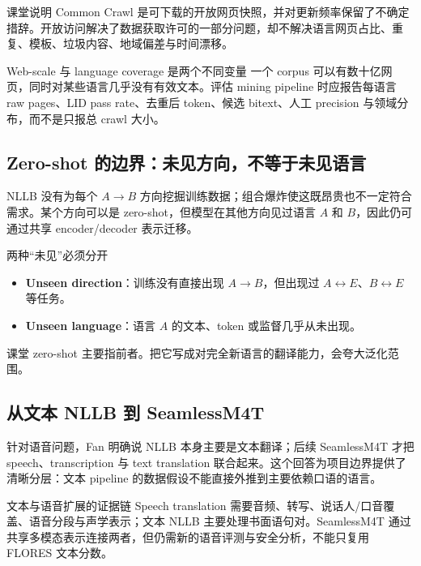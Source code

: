 \documentclass[a4paper]{article}
\begin{document}
课堂说明 Common Crawl 是可下载的开放网页快照，并对更新频率保留了不确定措辞。开放访问解决了数据获取许可的一部分问题，却不解决语言网页占比、重复、模板、垃圾内容、地域偏差与时间漂移。

\begin{warningbox}{Web-scale 与 language coverage 是两个不同变量}
一个 corpus 可以有数十亿网页，同时对某些语言几乎没有有效文本。评估 mining pipeline 时应报告每语言 raw pages、LID pass rate、去重后 token、候选 bitext、人工 precision 与领域分布，而不是只报总 crawl 大小。
\end{warningbox}

\subsection{Zero-shot 的边界：未见方向，不等于未见语言}

NLLB 没有为每个 $A\rightarrow B$ 方向挖掘训练数据；组合爆炸使这既昂贵也不一定符合需求。某个方向可以是 zero-shot，但模型在其他方向见过语言 $A$ 和 $B$，因此仍可通过共享 encoder/decoder 表示迁移。

\begin{importantbox}{两种“未见”必须分开}
\begin{itemize}
  \item \textbf{Unseen direction}：训练没有直接出现 $A\rightarrow B$，但出现过 $A\leftrightarrow E$、$B\leftrightarrow E$ 等任务。
  \item \textbf{Unseen language}：语言 $A$ 的文本、token 或监督几乎从未出现。
\end{itemize}
课堂 zero-shot 主要指前者。把它写成对完全新语言的翻译能力，会夸大泛化范围。
\end{importantbox}


\subsection{从文本 NLLB 到 SeamlessM4T}

针对语音问题，Fan 明确说 NLLB 本身主要是文本翻译；后续 SeamlessM4T 才把 speech、transcription 与 text translation 联合起来。这个回答为项目边界提供了清晰分层：文本 pipeline 的数据假设不能直接外推到主要依赖口语的语言。

\begin{knowledgebox}{文本与语音扩展的证据链}
Speech translation 需要音频、转写、说话人/口音覆盖、语音分段与声学表示；文本 NLLB 主要处理书面语句对。SeamlessM4T 通过共享多模态表示连接两者，但仍需新的语音评测与安全分析，不能只复用 FLORES 文本分数。
\end{knowledgebox}
\end{document}
